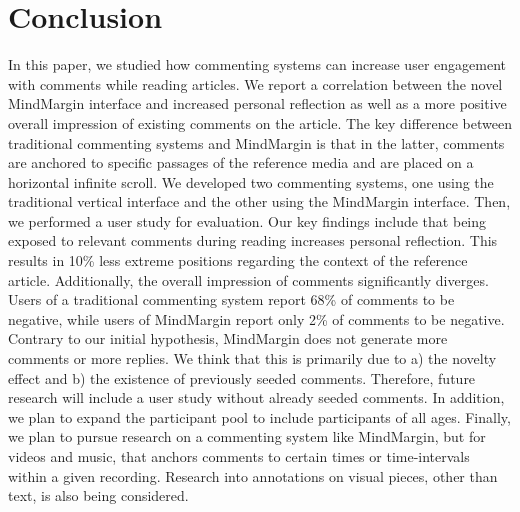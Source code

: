 \section{Conclusion}

In this paper, we studied how commenting systems can increase user engagement with comments while reading articles. We report a correlation between the novel MindMargin interface and increased personal reflection as well as a more positive overall impression of existing comments on the article. The key difference between traditional commenting systems and MindMargin is that in the latter, comments are anchored to specific passages of the reference media and are placed on a horizontal infinite scroll. We developed two commenting systems, one using the traditional vertical interface and the other using the MindMargin interface. Then, we performed a user study for evaluation. Our key findings include that being exposed to relevant comments during reading increases personal reflection. This results in 10\% less extreme positions regarding the context of the reference article. Additionally, the overall impression of comments significantly diverges. Users of a traditional commenting system report 68\% of comments to be negative, while users of MindMargin report only 2\% of comments to be negative. Contrary to our initial hypothesis, MindMargin does not generate more comments or more replies. We think that this is primarily due to a) the novelty effect and b) the existence of previously seeded comments. Therefore, future research will include a user study without already seeded comments. In addition, we plan to expand the participant pool to include participants of all ages. Finally, we plan to pursue research on a commenting system like MindMargin, but for videos and music, that anchors comments to certain times or time-intervals within a given recording. Research into annotations on visual pieces, other than text, is also being considered.
